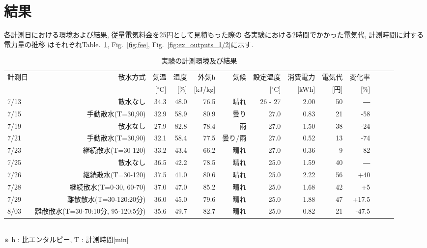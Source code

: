 \documentclass[a4j,fleqn,dvipdfmx,uplatex]{jsarticle}
\newcommand{\figref}[1]{Fig.\ \ref{#1}}
\newcommand{\tableref}[1]{Table.\ \ref{#1}}
\begin{document}
\section{結果}\label{sec3}
各計測日における環境および結果, 従量電気料金を25円として見積もった際の
各実験における2時間でかかった電気代, 計測時間に対する電力量の推移
はそれぞれ\tableref{table:ex}, \figref{fig:fee}, \figref{fig:ex_outputs_1/2}に示す. 

\begin{table}[htb]
  \caption{実験の計測環境及び結果}
  \label{table:ex}
  \centering
  \begin{tabular}{lrrrrrrrrrrrr}
    計測日 & 散水方式 & 気温 & 湿度 & 外気h & 気候 & 設定温度 & 消費電力 & 電気代 & 変化率 \\[-1.5mm]
     & & \small [$^\circ$C] & \small [\%] & \small [kJ/kg] & & \small [$^\circ$C] & \small [kWh] & \small [円] & \small [\%]\\
    \hline \hline
    7/13 & 散水なし & 34.3 & 48.0 & 76.5 & 晴れ & 26 - 27 & 2.00 & 50 & ― \\
    7/15 & 手動散水(T=30,90) & 32.9 & 58.9 & 80.9 & 曇り & 27.0 & 0.83 & 21 & -58 \\
    7/19 & 散水なし & 27.9 & 82.8 & 78.4 & 雨 & 27.0 & 1.50 & 38 & -24 \\
    7/21 & 手動散水(T=30,90) & 32.1 & 58.4 & 77.5 & 曇り/雨 & 27.0 & 0.52 & 13 & -74 \\
    7/23 & 継続散水(T=30-120) & 33.2 & 43.4 & 66.2 & 晴れ & 27.0 & 0.36 & 9 & -82 \\[3mm]
    7/25 & 散水なし & 36.5 & 42.2 & 78.5 & 晴れ & 25.0 & 1.59 & 40 & ― \\
    7/26 & 継続散水(T=30-120) & 37.5 & 41.0 & 80.6 & 晴れ & 25.0 & 2.22 & 56 & +40 \\
    7/28 & 継続散水(T=0-30, 60-70) & 37.0 & 47.0 & 85.2 & 晴れ & 25.0 & 1.68 & 42 & +5\\
    7/29 & 離散散水(T=30-120:20分) & 36.0 & 45.0 & 79.6 & 晴れ & 25.0 & 1.88 & 47 & +17.5 \\
    8/03  & \footnotesize 離散散水(T=30-70:10分, 95-120:5分) & 35.6 & 49.7 & 82.7 & 晴れ & 25.0 & 0.82 & 21 & -47.5 \\
    \hline
  \end{tabular}\\
  \small ※ h : 比エンタルピー, T : 計測時間[min]
\end{table}
\end{document}
